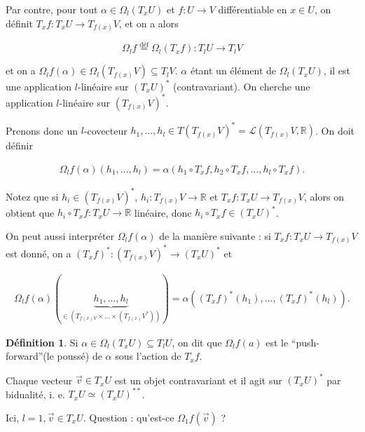 \documentclass[french]{article}
\theoremstyle{definition}
\newtheorem{protodefinition}{Définition}[section]
\newenvironment{definition}
    {\colorlet{shadecolor}{green!5}\begin{shaded}\begin{protodefinition}}
    {\end{protodefinition}\end{shaded}}
\theoremstyle{remark}
\begin{document}
Par contre, pour tout \(\alpha \in \Omega_l(T_x U)\) et \(f : U \longrightarrow V\) différentiable en \(x \in U\), on définit \(T_x f : T_x U \longrightarrow T _{f(x)} V\), et on a alors

\[\Omega_l f \stackrel{\text{déf}}{=} \Omega_l (T_x f) : T_l U \longrightarrow T_l V\]

et on a \(\Omega_l f (\alpha) \in \Omega_l(T _{f(x)} V)\subseteq T_l V\). \(\alpha\) étant un élément de \(\Omega_l(T_x U)\), il est une application \(l\)-linéaire sur \((T_x U)^{*}\) (contravariant). On cherche une application \(l\)-linéaire sur \((T _{f(x)} V)^{*}\).

Prenons donc un \(l\)-covecteur \(h_1, \dots, h_l \in T (T _{f(x)}V)^{*} = \mathscr{L}(T _{f(x)} V, \mathbb{R})\). On doit définir

\begin{gather*}
  \Omega_l f(\alpha)(h_1, \dots, h_l) = \alpha(h_1 \circ T_x f, h_2 \circ T_x f, \dots, h_l \circ T_x f).
\end{gather*}

Notez que si \(h_i \in (T _{f(x)}V)^{*}\), \(h_i : T _{f(x)}V \longrightarrow \mathbb{R}\) et \(T_x f : T_x U \longrightarrow T _{f(x)}V\), alors on obtient que \(h_i \circ T_x f : T_x U \longrightarrow \mathbb{R}\) linéaire, donc \(h_i \circ T_x f \in (T_x U)^{*}\).


On peut aussi interpréter \(\Omega_l f(\alpha)\) de la manière suivante : si \(T_x f : T_x U \longrightarrow T _{f(x)} V\) est donné, on a \((T_x f)^{*} : (T _{f(x)}V)^{*} \longrightarrow (T_x U)^{*}\) et

\begin{gather*}
  \Omega_l f(\alpha)(\underbrace{h_1, \dots, h_l}_{\in (T _{f(x) V}\times \dots \times (T _{f(x)}V^{*}))}) = \alpha((T_x f)^{*}(h_1),\dots, (T_x f)^{*}(h_l)).
\end{gather*}

\begin{definition}
  Si \(\alpha \in \Omega_l (T_x U) \subseteq T_l U\), on dit que \(\Omega_l f(a)\) est le ``push-forward''(le poussé) de \(\alpha\) sous l'action de \(T_x f\).
\end{definition}

Chaque vecteur \(\overrightarrow{v} \in T_x U\) est un objet contravariant et il agit sur \((T_x U)^{*}\) par bidualité, i. e. \(T_x U \simeq (T_x U)^{**}\).

Ici, \(l=1, \overrightarrow{v} \in T_x U\). Question : qu'est-ce \(\Omega_1 f(\overrightarrow{v})\) ?
\end{document}
